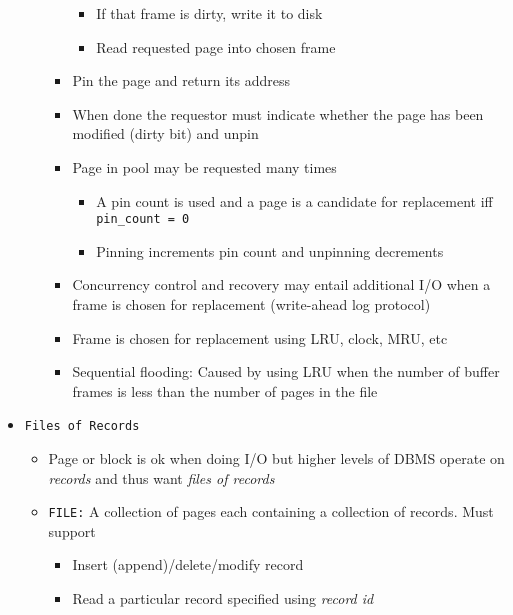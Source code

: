 \documentclass[landscape,8pt]{extarticle}
\newcommand{\code}{\lstinline}
\begin{document}
\begin{multicols}{5}
\begin{itemize}
\begin{itemize}
\begin{itemize}
\begin{itemize}
                                      \item If that frame is dirty, write it to disk
                                      \item Read requested page into chosen frame
                                  \end{itemize}
                            \item Pin the page and return its address
                            \item When done the requestor must indicate whether the page has been modified (dirty bit) and unpin
                            \item Page in pool may be requested many times
                                  \begin{itemize}
                                      \item A pin count is used and a page is a candidate for replacement iff \code{pin_count = 0}
                                      \item Pinning increments pin count and unpinning decrements
                                  \end{itemize}
                            \item Concurrency control and recovery may entail additional I/O when a frame is chosen for replacement (write-ahead log protocol)
                            \item Frame is chosen for replacement using LRU, clock, MRU, etc
                            \item Sequential flooding: Caused by using LRU when the number of buffer frames is less than the number of pages in the file
                        \end{itemize}
              \end{itemize}
        \item \code{Files of Records}
              \begin{itemize}
                  \item Page or block is ok when doing I/O but higher levels of DBMS operate on \emph{records} and thus want \emph{files of records}
                  \item \code{FILE:} A collection of pages each containing a collection of records. Must support
                        \begin{itemize}
                            \item Insert (append)/delete/modify record
                            \item Read a particular record specified using \emph{record id}

\end{itemize}
\end{itemize}
\end{itemize}
\end{multicols}
\end{document}
